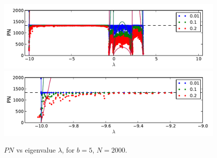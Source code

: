 \documentclass[onecolumn,fleqn,longbibliography]{revtex4}
\begin{document}
\begin{figure}[H]
    \includegraphics{pta_anderson_ddonly_b5}\\
    \includegraphics{pta_anderson_ddonly_b5_zoom}
    \caption{$PN$ vs eigenvalue $\lambda$, for $b=5$, $N=2000$.}
    \label{fig:dos}
\end{figure}
\end{document}
